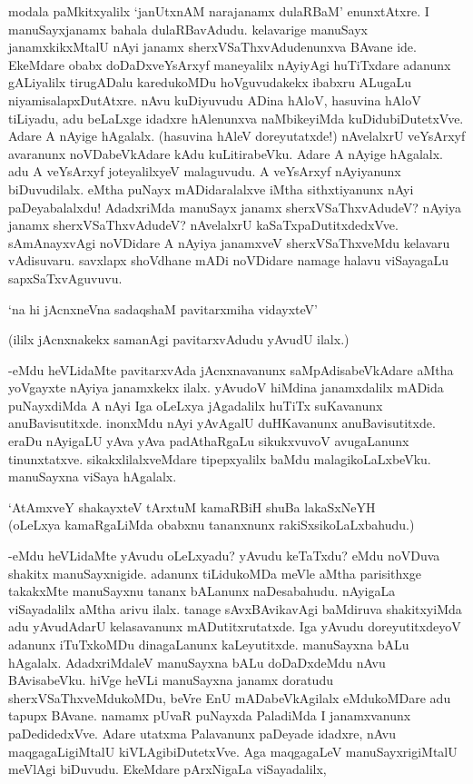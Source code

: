 modala paMkitxyalilx `janUtxnAM narajanamx dulaRBaM' enunxtAtxre. I manuSayxjanamx bahala dulaRBavAdudu. kelavarige manuSayx janamxkikxMtalU nAyi janamx sherxVSaThxvAdudenunxva BAvane ide. EkeMdare obabx doDaDxveYsArxyf maneyalilx nAyiyAgi huTiTxdare adanunx gALiyalilx tirugADalu karedukoMDu hoVguvudakekx ibabxru ALugaLu niyamisalapxDutAtxre. nAvu kuDiyuvudu ADina hAloV, hasuvina hAloV tiLiyadu, adu beLaLxge idadxre hAlenunxva naMbikeyiMda kuDidubiDutetxVve. Adare A nAyige hAgalalx. (hasuvina hAleV doreyutatxde!) nAvelalxrU veYsArxyf avaranunx noVDabeVkAdare kAdu kuLitirabeVku. Adare A nAyige hAgalalx. adu A veYsArxyf joteyalilxyeV malaguvudu. A veYsArxyf nAyiyanunx biDuvudilalx. eMtha puNayx mADidaralalxve iMtha sithxtiyanunx nAyi paDeyabalalxdu! AdadxriMda manuSayx janamx sherxVSaThxvAdudeV? nAyiya janamx sherxVSaThxvAdudeV? nAvelalxrU kaSaTxpaDutitxdedxVve. sAmAnayxvAgi noVDidare A nAyiya janamxveV sherxVSaThxveMdu kelavaru vAdisuvaru. savxlapx shoVdhane mADi noVDidare namage halavu viSayagaLu sapxSaTxvAguvuvu.

\begin{shloka}
`na hi jAcnxneVna sadaqshaM pavitarxmiha vidayxteV'
\end{shloka}

(ililx jAcnxnakekx samanAgi pavitarxvAdudu yAvudU ilalx.)

-eMdu heVLidaMte pavitarxvAda jAcnxnavanunx saMpAdisabeVkAdare aMtha yoVgayxte nAyiya janamxkekx ilalx. yAvudoV hiMdina janamxdalilx mADida puNayxdiMda A nAyi Iga oLeLxya jAgadalilx huTiTx suKavanunx anuBavisutitxde. inonxMdu nAyi yAvAgalU duHKavanunx anuBavisutitxde. eraDu nAyigaLU yAva yAva padAthaRgaLu sikukxvuvoV avugaLanunx tinunxtatxve. sikakxlilalxveMdare tipepxyalilx baMdu malagikoLaLxbeVku. manuSayxna viSaya hAgalalx.

\begin{shloka}
`AtAmxveY shakayxteV tArxtuM kamaRBiH shuBa lakaSxNeYH\\
(oLeLxya kamaRgaLiMda obabxnu tananxnunx rakiSxsikoLaLxbahudu.)
\end{shloka}

-eMdu heVLidaMte yAvudu oLeLxyadu? yAvudu keTaTxdu? eMdu noVDuva shakitx manuSayxnigide. adanunx tiLidukoMDa meVle aMtha parisithxge takakxMte manuSayxnu tananx bALanunx naDesabahudu. nAyigaLa viSayadalilx aMtha arivu ilalx. tanage sAvxBAvikavAgi baMdiruva shakitxyiMda adu yAvudAdarU kelasavanunx mADutitxrutatxde. Iga yAvudu doreyutitxdeyoV adanunx iTuTxkoMDu dinagaLanunx kaLeyutitxde. manuSayxna bALu hAgalalx. AdadxriMdaleV manuSayxna bALu doDaDxdeMdu nAvu BAvisabeVku. hiVge heVLi manuSayxna janamx doratudu sherxVSaThxveMdukoMDu, beVre EnU mADabeVkAgilalx eMdukoMDare adu tapupx BAvane. namamx pUvaR puNayxda PaladiMda I janamxvanunx paDedidedxVve. Adare utatxma Palavanunx paDeyade idadxre, nAvu maqgagaLigiMtalU kiVLAgibiDutetxVve. Aga maqgagaLeV manuSayxrigiMtalU meVlAgi biDuvudu. EkeMdare pArxNigaLa viSayadalilx,

